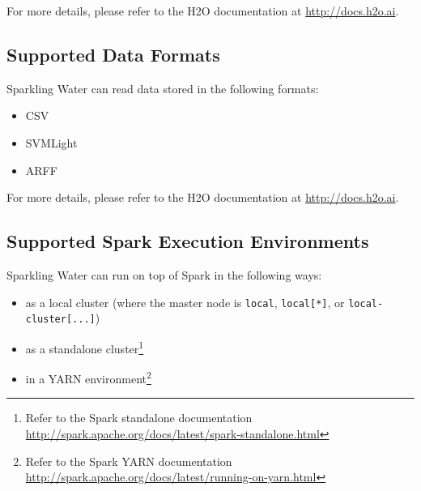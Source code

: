\documentclass{standalone}
\begin{document}
For more details, please refer to the H2O documentation at {\url{http://docs.h2o.ai}}.

\subsection{Supported Data Formats}

Sparkling Water can read data stored in the following formats:

\begin{itemize}

  \item CSV
  \item SVMLight
  \item ARFF
\end{itemize}

For more details, please refer to the H2O documentation at {\url{http://docs.h2o.ai}}.

\subsection{Supported Spark Execution Environments}
Sparkling Water can run on top of Spark in the following ways:
\begin{itemize}
  \item as a local cluster (where the master node is \texttt{local},
\texttt{local[*]}, or \texttt{local-cluster[...]})
  \item as a standalone cluster\footnote{Refer to the Spark standalone documentation
\url{http://spark.apache.org/docs/latest/spark-standalone.html}} 
\item in a YARN environment\footnote{Refer to the Spark YARN documentation \url{http://spark.apache.org/docs/latest/running-on-yarn.html}}

\end{itemize}
\end{document}
